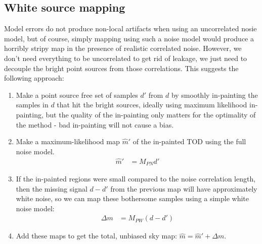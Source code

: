 \documentclass{article}
\begin{document}
\subsection{White source mapping}
Model errors do not produce non-local artifacts when using an uncorrelated nosie model,
but of course, simply mapping using such a noise model would produce a horribly stripy
map in the presence of realistic correlated noise. However, we don't need everything to
be uncorrelated to get rid of leakage, we just need to decouple the bright point sources
from those correlations. This suggests the following approach:
\begin{enumerate}
	\item Make a point source free set of samples $d'$ from $d$ by smoothly in-painting the samples in $d$
		that hit the bright sources, ideally using maximum likelihood in-painting, but the quality of the
		in-painting only matters for the optimality of the method - bad in-painting will not cause a bias.
	\item Make a maximum-likelihood map $\hat m'$ of the in-painted TOD using the full noise model.
		\begin{align}
		\hat m' &= M_{PN} d'
		\end{align}
	\item If the in-painted regions were small compared to the noise correlation length, then
		the missing signal $d-d'$ from the previous map will have approximately white noise,
		so we can map these bothersome samples using a simple white noise model:
		\begin{align}
		\Delta m &= M_{PW}(d-d')
		\end{align}
	\item Add these maps to get the total, unbiased sky map: $\hat m = \hat m' + \Delta m$.
\end{enumerate}
\end{document}
